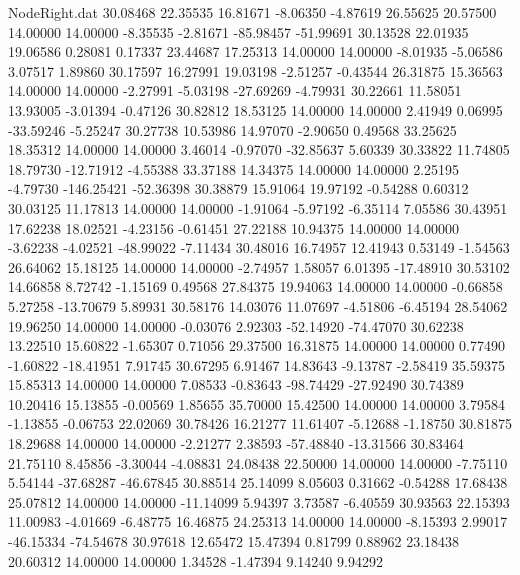\begin{filecontents}{NodeRight.dat}
  30.08468   22.35535   16.81671    -8.06350   -4.87619   26.55625   20.57500   14.00000   14.00000   -8.35535   -2.81671  -85.98457  -51.99691
  30.13528   22.01935   19.06586     0.28081    0.17337   23.44687   17.25313   14.00000   14.00000   -8.01935   -5.06586    3.07517    1.89860
  30.17597   16.27991   19.03198    -2.51257   -0.43544   26.31875   15.36563   14.00000   14.00000   -2.27991   -5.03198  -27.69269   -4.79931
  30.22661   11.58051   13.93005    -3.01394   -0.47126   30.82812   18.53125   14.00000   14.00000    2.41949    0.06995  -33.59246   -5.25247
  30.27738   10.53986   14.97070    -2.90650    0.49568   33.25625   18.35312   14.00000   14.00000    3.46014   -0.97070  -32.85637    5.60339
  30.33822   11.74805   18.79730   -12.71912   -4.55388   33.37188   14.34375   14.00000   14.00000    2.25195   -4.79730 -146.25421  -52.36398
  30.38879   15.91064   19.97192    -0.54288    0.60312   30.03125   11.17813   14.00000   14.00000   -1.91064   -5.97192   -6.35114    7.05586
  30.43951   17.62238   18.02521    -4.23156   -0.61451   27.22188   10.94375   14.00000   14.00000   -3.62238   -4.02521  -48.99022   -7.11434
  30.48016   16.74957   12.41943     0.53149   -1.54563   26.64062   15.18125   14.00000   14.00000   -2.74957    1.58057    6.01395  -17.48910
  30.53102   14.66858    8.72742    -1.15169    0.49568   27.84375   19.94063   14.00000   14.00000   -0.66858    5.27258  -13.70679    5.89931
  30.58176   14.03076   11.07697    -4.51806   -6.45194   28.54062   19.96250   14.00000   14.00000   -0.03076    2.92303  -52.14920  -74.47070
  30.62238   13.22510   15.60822    -1.65307    0.71056   29.37500   16.31875   14.00000   14.00000    0.77490   -1.60822  -18.41951    7.91745
  30.67295    6.91467   14.83643    -9.13787   -2.58419   35.59375   15.85313   14.00000   14.00000    7.08533   -0.83643  -98.74429  -27.92490
  30.74389   10.20416   15.13855    -0.00569    1.85655   35.70000   15.42500   14.00000   14.00000    3.79584   -1.13855   -0.06753   22.02069
  30.78426   16.21277   11.61407    -5.12688   -1.18750   30.81875   18.29688   14.00000   14.00000   -2.21277    2.38593  -57.48840  -13.31566
  30.83464   21.75110    8.45856    -3.30044   -4.08831   24.08438   22.50000   14.00000   14.00000   -7.75110    5.54144  -37.68287  -46.67845
  30.88514   25.14099    8.05603     0.31662   -0.54288   17.68438   25.07812   14.00000   14.00000  -11.14099    5.94397    3.73587   -6.40559
  30.93563   22.15393   11.00983    -4.01669   -6.48775   16.46875   24.25313   14.00000   14.00000   -8.15393    2.99017  -46.15334  -74.54678
  30.97618   12.65472   15.47394     0.81799    0.88962   23.18438   20.60312   14.00000   14.00000    1.34528   -1.47394    9.14240    9.94292

\end{filecontents}
